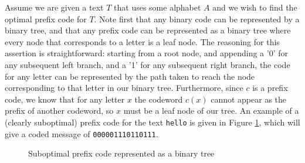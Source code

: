 \documentclass[paper=a4, fontsize=10pt]{article} %
\numberwithin{equation}{section} %
\numberwithin{figure}{section} %
\numberwithin{table}{section} %
\begin{document}
Assume we are given a text $T$ that uses some alphabet $A$ and we wish to find the optimal prefix code for $T$. Note first that any binary code can be represented by a binary tree, and that any prefix code can be represented as a binary tree where every node that corresponds to a letter is a leaf node. The reasoning for this assertion is straightforward: starting from a root node, and appending a '0' for any subsequent left branch, and a '1' for any subsequent right branch, the code for any letter can be represented by the path taken to reach the node corresponding to that letter in our binary tree. Furthermore, since $c$ is a prefix code, we know that for any letter $x$ the codeword $c(x)$ cannot appear as the prefix of another codeword, so $x$ must be a leaf node of our tree. An example of a (clearly suboptimal) prefix code for the text \texttt{hello} is given in Figure \ref{fig:subopt}, which will give a coded message of \texttt{000001110110111}.

\begin{figure}[h]
\centering 


\caption{Suboptimal prefix code represented as a binary tree} \label{fig:subopt}
\end{figure}
\end{document}
